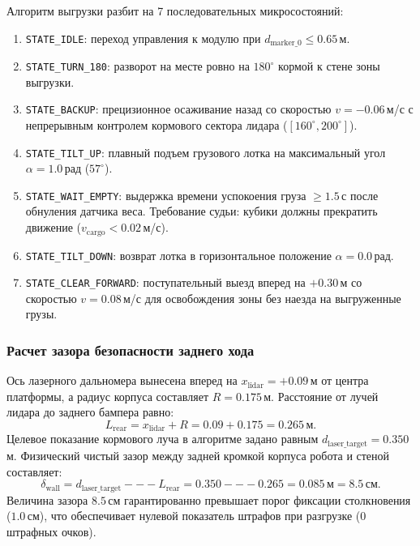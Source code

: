 \documentclass[a4paper,11pt]{article}
\begin{document}
Алгоритм выгрузки разбит на 7 последовательных микросостояний:
\begin{enumerate}
    \item \texttt{STATE\_IDLE}: переход управления к модулю при $d_{\text{marker\_0}} \le 0.65$\,м.
    \item \texttt{STATE\_TURN\_180}: разворот на месте ровно на $180^\circ$ кормой к стене зоны выгрузки.
    \item \texttt{STATE\_BACKUP}: прецизионное осаживание назад со скоростью $v = -0.06$\,м/с с непрерывным контролем кормового сектора лидара ($[160^\circ, 200^\circ]$).
    \item \texttt{STATE\_TILT\_UP}: плавный подъем грузового лотка на максимальный угол $\alpha = 1.0$\,рад ($57^\circ$).
    \item \texttt{STATE\_WAIT\_EMPTY}: выдержка времени успокоения груза $\ge 1.5$\,с после обнуления датчика веса. Требование судьи: кубики должны прекратить движение ($v_{\text{cargo}} < 0.02$\,м/с).
    \item \texttt{STATE\_TILT\_DOWN}: возврат лотка в горизонтальное положение $\alpha = 0.0$\,рад.
    \item \texttt{STATE\_CLEAR\_FORWARD}: поступательный выезд вперед на $+0.30$\,м со скоростью $v = 0.08$\,м/с для освобождения зоны без наезда на выгруженные грузы.
\end{enumerate}

\subsubsection{Расчет зазора безопасности заднего хода}
Ось лазерного дальномера вынесена вперед на $x_{\text{lidar}} = +0.09$\,м от центра платформы, а радиус корпуса составляет $R = 0.175$\,м. Расстояние от лучей лидара до заднего бампера равно:
\begin{equation}
L_{\text{rear}} = x_{\text{lidar}} + R = 0.09 + 0.175 = 0.265\,\text{м}.
\end{equation}
Целевое показание кормового луча в алгоритме задано равным $d_{\text{laser\_target}} = 0.350$\,м. Физический чистый зазор между задней кромкой корпуса робота и стеной составляет:
\begin{equation}
\delta_{\text{wall}} = d_{\text{laser\_target}} --- L_{\text{rear}} = 0.350 --- 0.265 = 0.085\,\text{м} = 8.5\,\text{см}.
\end{equation}
Величина зазора $8.5$\,см гарантированно превышает порог фиксации столкновения ($1.0$\,см), что обеспечивает нулевой показатель штрафов при разгрузке ($0$ штрафных очков).
\end{document}

